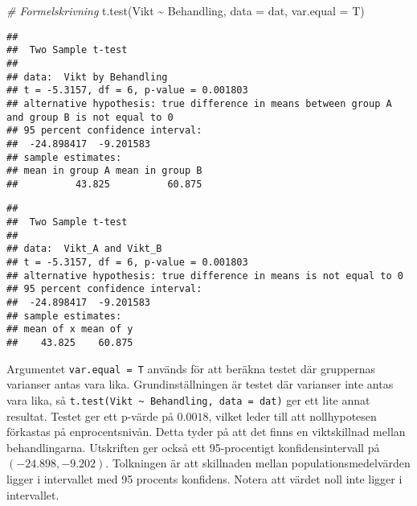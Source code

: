 \documentclass[
]{book}
\newenvironment{Shaded}{\begin{snugshade}}{\end{snugshade}}
\newcommand{\AttributeTok}[1]{\textcolor[rgb]{0.77,0.63,0.00}{#1}}
\newcommand{\CommentTok}[1]{\textcolor[rgb]{0.56,0.35,0.01}{\textit{#1}}}
\newcommand{\DocumentationTok}[1]{\textcolor[rgb]{0.56,0.35,0.01}{\textbf{\textit{#1}}}}
\newcommand{\FunctionTok}[1]{\textcolor[rgb]{0.00,0.00,0.00}{#1}}
\newcommand{\NormalTok}[1]{#1}
\newcommand{\OtherTok}[1]{\textcolor[rgb]{0.56,0.35,0.01}{#1}}
\newcommand{\SpecialCharTok}[1]{\textcolor[rgb]{0.00,0.00,0.00}{#1}}
\newcommand{\StringTok}[1]{\textcolor[rgb]{0.31,0.60,0.02}{#1}}
\theoremstyle{definition}
\theoremstyle{definition}
\theoremstyle{definition}
\theoremstyle{definition}
\theoremstyle{remark}
\begin{document}
\begin{Shaded}
\begin{Highlighting}[]
\CommentTok{\# Formelskrivning}
\FunctionTok{t.test}\NormalTok{(Vikt }\SpecialCharTok{\textasciitilde{}}\NormalTok{ Behandling, }\AttributeTok{data =}\NormalTok{ dat, }\AttributeTok{var.equal =}\NormalTok{ T)}
\end{Highlighting}
\end{Shaded}

\begin{verbatim}
## 
##  Two Sample t-test
## 
## data:  Vikt by Behandling
## t = -5.3157, df = 6, p-value = 0.001803
## alternative hypothesis: true difference in means between group A and group B is not equal to 0
## 95 percent confidence interval:
##  -24.898417  -9.201583
## sample estimates:
## mean in group A mean in group B 
##          43.825          60.875
\end{verbatim}

\begin{Shaded}
\end{Shaded}

\begin{verbatim}
## 
##  Two Sample t-test
## 
## data:  Vikt_A and Vikt_B
## t = -5.3157, df = 6, p-value = 0.001803
## alternative hypothesis: true difference in means is not equal to 0
## 95 percent confidence interval:
##  -24.898417  -9.201583
## sample estimates:
## mean of x mean of y 
##    43.825    60.875
\end{verbatim}

Argumentet \texttt{var.equal\ =\ T} används för att beräkna testet där gruppernas varianser antas vara lika. Grundinställningen är testet där varianser inte antas vara lika, så \texttt{t.test(Vikt\ \textasciitilde{}\ Behandling,\ data\ =\ dat)} ger ett lite annat resultat.
Testet ger ett p-värde på \(0.0018\), vilket leder till att nollhypotesen förkastas på enprocentsnivån. Detta tyder på att det finns en viktskillnad mellan behandlingarna. Utskriften ger också ett 95-procentigt konfidensintervall på \((-24.898, -9.202)\). Tolkningen är att skillnaden mellan populationsmedelvärden ligger i intervallet med 95 procents konfidens. Notera att värdet noll inte ligger i intervallet.
\end{document}
